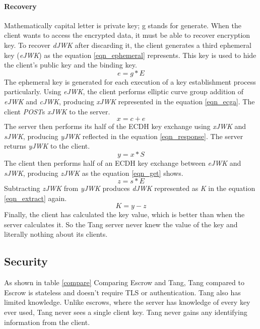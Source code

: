 \paragraph{Recovery}
Mathematically capital letter is private key; g stands for generate.
When the client wants to access the encrypted data, it must be able to recover encryption key.
To recover {\it dJWK} after discarding it, the client generates a third ephemeral key ({\it eJWK}) as the equation \ref{eqn_ephemeral} represents.
This key is used to hide the client's public key and the binding key.
\begin{equation}\label{eqn_ephemeral}
    e = g * E
\end{equation}
The ephemeral key is generated for each execution of a key establishment process particularly.
Using {\it eJWK}, the client performs elliptic curve group addition of {\it eJWK} and {\it cJWK}, producing {\it xJWK} represented in the equation \ref{eqn_ecga}.
The client {\it POST}s {\it xJWK} to the server.
\begin{equation}\label{eqn_ecga}
    x = c + e
\end{equation}
The server then performs its half of the ECDH key exchange using {\it xJWK} and {\it sJWK}, producing {\it yJWK} reflected in the equation \ref{eqn_response}. The server returns {\it yJWK} to the client.
\begin{equation}\label{eqn_response}
    y = x * S
\end{equation}
The client then performs half of an ECDH key exchange between {\it eJWK} and {\it sJWK}, producing {\it zJWK} as the equation \ref{eqn_get} shows.
\begin{equation}\label{eqn_get}
    z = s * E
\end{equation}
Subtracting {\it zJWK} from {\it yJWK} produces {\it dJWK} represented as {\it K} in the equation \ref{eqn_extract} again.
\begin{equation}\label{eqn_extract}
    K = y - z
\end{equation}
Finally, the client has calculated the key value, which is better than when the server calculates it.
So the Tang server never knew the value of the key and literally nothing about its clients.



\subsection{Security}

As shown in table \ref{compare} Comparing Escrow and Tang, Tang compared to Escrow is stateless and doesn't require TLS or authentication.
Tang also has limited knowledge.
Unlike escrows, where the server has knowledge of every key ever used, Tang never sees a single client key.
Tang never gains any identifying information from the client.

